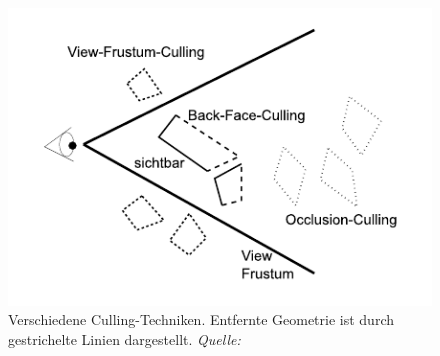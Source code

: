 \begin{figure}
  \centering
  \includegraphics[scale=0.8]{images/culling.pdf}
  \caption{Verschiedene Culling-Techniken. Entfernte Geometrie ist durch gestrichelte Linien dargestellt. \textit{Quelle: \cite{culling}} }
  \label{fig:basics:culling}
\end{figure}
